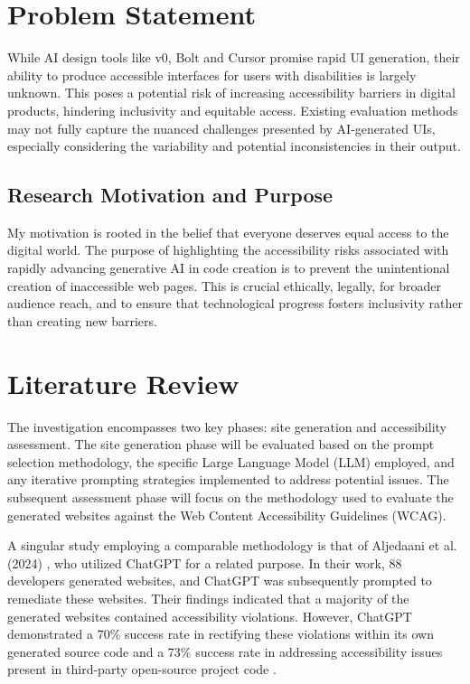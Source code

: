 \documentclass{article}
\begin{document}
\printacronyms[display=all,heading=section]

\section{Problem Statement}
While AI design tools like v0, Bolt and Cursor promise rapid UI generation,
their ability to produce accessible interfaces for users with disabilities is largely unknown.
This poses a potential risk of increasing accessibility barriers in digital products, hindering inclusivity and equitable access.
Existing evaluation methods may not fully capture the nuanced challenges presented by AI-generated UIs, especially considering the variability
and potential inconsistencies in their output.

\subsection{Research Motivation and Purpose}

My motivation is rooted in the belief that everyone deserves equal access to the digital world.
The purpose of highlighting the accessibility risks associated with rapidly advancing generative AI in code creation is
to prevent the unintentional creation of inaccessible web pages.
This is crucial ethically, legally, for broader audience reach, and to ensure that technological progress fosters inclusivity rather than creating new barriers.

\section{Literature Review}
The investigation encompasses two key phases: site generation and accessibility assessment.
The site generation phase will be evaluated based on the prompt selection methodology, the specific Large Language Model (LLM) employed,
and any iterative prompting strategies implemented to address potential issues.
The subsequent assessment phase will focus on the methodology used to evaluate the generated websites against the Web Content Accessibility Guidelines (WCAG).

A singular study employing a comparable methodology is that of Aljedaani et al. (2024) \cite{aljedaani_does_2024}, who utilized ChatGPT for a related purpose.
In their work, 88 developers generated websites, and ChatGPT was subsequently prompted to remediate these websites.
Their findings indicated that a majority of the generated websites contained accessibility violations.
However, ChatGPT demonstrated a 70\% success rate in rectifying these violations within its own generated source code
and a 73\% success rate in addressing accessibility issues present in third-party open-source project code \cite{aljedaani_does_2024}.
\end{document}
